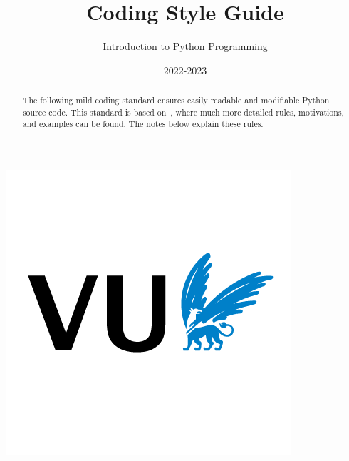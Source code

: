\documentclass{tufte-handout}
\title{Coding Style Guide}%
\author[Mauricio Verano Merino]{Introduction to Python Programming}
\date{2022-2023} %
\begin{document}
\maketitle%

\begin{marginfigure}[-4cm]%
  \includegraphics[width=\linewidth]{vu}
\end{marginfigure}

\begin{abstract}
\noindent
The following mild coding standard ensures
easily readable and modifiable Python source code.
This standard is based on~\cite{CodeConventions:2001},
where much more detailed rules, motivations, and examples can be found.
The notes below explain these rules.
\end{abstract}
\end{document}
